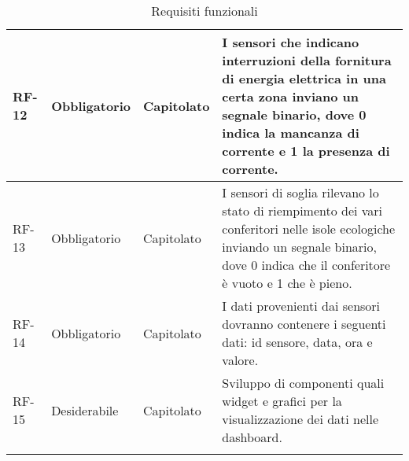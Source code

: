 \begin{longtable}{|>{\centering\arraybackslash}m{}|>{\centering\arraybackslash}m{}|>{\centering\arraybackslash}m{}|>{\centering\arraybackslash}m{}|}
	RF-12           & Obbligatorio        & Capitolato     & I sensori che indicano interruzioni della fornitura di energia elettrica in una certa zona inviano un segnale binario, dove 0 indica la mancanza di corrente e 1 la presenza di corrente.                                                                                                                          \\\hline
	RF-13           & Obbligatorio        & Capitolato     & I sensori di soglia rilevano lo stato di riempimento dei vari conferitori nelle isole ecologiche inviando un segnale binario, dove 0 indica che il conferitore è vuoto e 1 che è pieno.                                                                                                                            \\\hline
	RF-14           & Obbligatorio        & Capitolato     & I dati provenienti dai sensori dovranno contenere i seguenti dati: id sensore, data, ora e valore.                                                                                                                                                                                                                 \\\hline
	RF-15           & Desiderabile        & Capitolato     & Sviluppo di componenti quali widget e grafici per la visualizzazione dei dati nelle dashboard.                                                                                                                                                                                                                     \\\hline

	\caption{Requisiti funzionali}
	\label{table:1}
\end{longtable}

